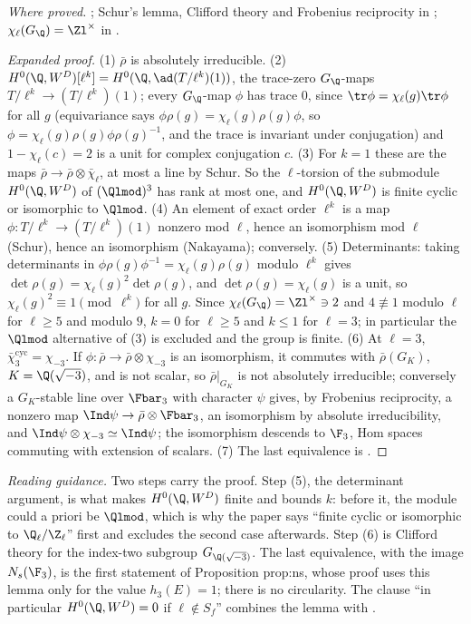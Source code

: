 \begin{sloppypar}
\noindent\emph{Where proved.} ; Schur's lemma, Clifford theory and Frobenius reciprocity in ; $\chi_\ell(G_\Q)=\Zl^\times$ in .

\begin{proof}[Expanded proof]
(1) $\bar\rho$ is absolutely irreducible. (2) $H^0(\Q,W^D)[\ell^k]=H^0(\Q,\ad(T/\ell^k)(1))$, the trace-zero $G_\Q$-maps $T/\ell^k\to(T/\ell^k)(1)$; every $G_\Q$-map $\phi$ has trace $0$, since
$\tr\phi=\chi_\ell(g)\tr\phi$ for all $g$ (equivariance says $\phi\rho(g)=\chi_\ell(g)\rho(g)\phi$, so $\phi=\chi_\ell(g)\rho(g)\phi\rho(g)^{-1}$, and the trace is invariant under conjugation) and
$1-\chi_\ell(c)=2$ is a unit for complex conjugation $c$. (3) For $k=1$ these are the maps $\bar\rho\to\bar\rho\otimes\bar\chi_\ell$, at most a line by Schur.
So the $\ell$-torsion of the submodule $H^0(\Q,W^D)$ of $(\Qlmod)^3$ has rank at most one, and $H^0(\Q,W^D)$ is finite cyclic or isomorphic to $\Qlmod$. (4) An element of exact
order $\ell^k$ is a map $\phi\colon T/\ell^k\to(T/\ell^k)(1)$ nonzero mod $\ell$, hence an isomorphism mod $\ell$ (Schur), hence an isomorphism (Nakayama); conversely. (5) Determinants:
taking determinants in $\phi\rho(g)\phi^{-1}=\chi_\ell(g)\rho(g)$ modulo $\ell^k$ gives $\det\rho(g)=\chi_\ell(g)^2\det\rho(g)$, and $\det\rho(g)=\chi_\ell(g)$ is a unit, so
$\chi_\ell(g)^2\equiv1\pmod{\ell^k}$ for all $g$. Since $\chi_\ell(G_\Q)=\Zl^\times\ni2$ and $4\not\equiv1$ modulo $\ell$ for $\ell\ge5$ and modulo $9$, $k=0$ for $\ell\ge5$ and $k\le1$ for $\ell=3$; in
particular the $\Qlmod$ alternative of (3) is excluded and the group is finite. (6) At $\ell=3$, $\bar\chi_3^{\mathrm{cyc}}=\chi_{-3}$. If $\phi\colon\bar\rho\to\bar\rho\otimes\chi_{-3}$ is an isomorphism, it
commutes with $\bar\rho(G_K)$, $K=\Q(\sqrt{-3})$, and is not scalar, so $\bar\rho|_{G_K}$ is not absolutely irreducible; conversely a $G_K$-stable line over $\Fbar_3$ with character $\psi$ gives, by
Frobenius reciprocity, a nonzero map $\Ind\psi\to\bar\rho\otimes\Fbar_3$, an isomorphism by absolute irreducibility, and $\Ind\psi\otimes\chi_{-3}\simeq\Ind\psi$; the isomorphism descends to $\F_3$,
Hom spaces commuting with extension of scalars. (7) The last equivalence is .
\end{proof}

\noindent\emph{Reading guidance.} Two steps carry the proof. Step (5), the determinant argument, is what makes $H^0(\Q,W^D)$ finite and bounds $k$: before it, the module
could a priori be $\Qlmod$, which is why the paper says ``finite cyclic or isomorphic to $\Q_\ell/\Z_\ell$'' first and excludes the second case afterwards. Step (6) is Clifford
theory for the index-two subgroup $G_{\Q(\sqrt{-3})}$. The last equivalence, with the image $N_s(\F_3)$, is the first statement of Proposition prop:ns, whose proof uses this lemma
only for the value $h_3(E)=1$; there is no circularity. The clause ``in particular $H^0(\Q,W^D)=0$ if $\ell\notin S_f$'' combines the lemma with .


\end{sloppypar}
